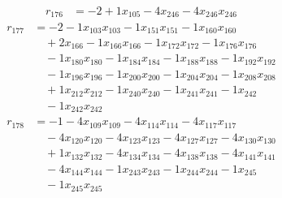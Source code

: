 \[\begin{aligned}
r_{176} &= - 2 + 1 x_{105} - 4 x_{246} - 4 x_{246} x_{246}
\end{aligned}\]
\[\begin{aligned}
r_{177} &= - 2 - 1 x_{103} x_{103} - 1 x_{151} x_{151} - 1 x_{160} x_{160} \\
 &\quad + 2 x_{166} - 1 x_{166} x_{166} - 1 x_{172} x_{172} - 1 x_{176} x_{176} \\
 &\quad - 1 x_{180} x_{180} - 1 x_{184} x_{184} - 1 x_{188} x_{188} - 1 x_{192} x_{192} \\
 &\quad - 1 x_{196} x_{196} - 1 x_{200} x_{200} - 1 x_{204} x_{204} - 1 x_{208} x_{208} \\
 &\quad + 1 x_{212} x_{212} - 1 x_{240} x_{240} - 1 x_{241} x_{241} - 1 x_{242} \\
 &\quad - 1 x_{242} x_{242}
\end{aligned}\]
\[\begin{aligned}
r_{178} &= - 1 - 4 x_{109} x_{109} - 4 x_{114} x_{114} - 4 x_{117} x_{117} \\
 &\quad - 4 x_{120} x_{120} - 4 x_{123} x_{123} - 4 x_{127} x_{127} - 4 x_{130} x_{130} \\
 &\quad + 1 x_{132} x_{132} - 4 x_{134} x_{134} - 4 x_{138} x_{138} - 4 x_{141} x_{141} \\
 &\quad - 4 x_{144} x_{144} - 1 x_{243} x_{243} - 1 x_{244} x_{244} - 1 x_{245} \\
 &\quad - 1 x_{245} x_{245}
\end{aligned}\]
\endgroup
